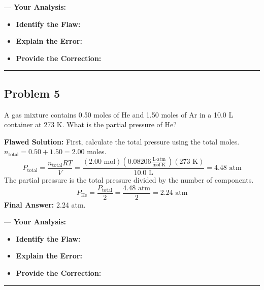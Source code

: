 \documentclass{article}
\begin{document}
---
\textbf{Your Analysis:}
\begin{itemize}
    \item \textbf{Identify the Flaw:}
    \item \textbf{Explain the Error:}
    \item \textbf{Provide the Correction:}
\end{itemize}
\rule{\textwidth}{0.4pt}

\subsection{Problem 5}
A gas mixture contains 0.50 moles of He and 1.50 moles of Ar in a 10.0 L container at 273 K. What is the partial pressure of He?

\textbf{Flawed Solution:}
First, calculate the total pressure using the total moles.
$n_{\text{total}} = 0.50 + 1.50 = 2.00$ moles.
\[ P_{\text{total}} = \frac{n_{\text{total}}RT}{V} = \frac{(2.00 \text{ mol})(0.08206 \frac{\text{L} \cdot \text{atm}}{\text{mol} \cdot \text{K}})(273 \text{ K})}{10.0 \text{ L}} = 4.48 \text{ atm} \]
The partial pressure is the total pressure divided by the number of components.
\[ P_{\text{He}} = \frac{P_{\text{total}}}{2} = \frac{4.48 \text{ atm}}{2} = 2.24 \text{ atm} \]
\textbf{Final Answer:} 2.24 atm.

---
\textbf{Your Analysis:}
\begin{itemize}
    \item \textbf{Identify the Flaw:}
    \item \textbf{Explain the Error:}
    \item \textbf{Provide the Correction:}
\end{itemize}
\rule{\textwidth}{0.4pt}
\end{document}
